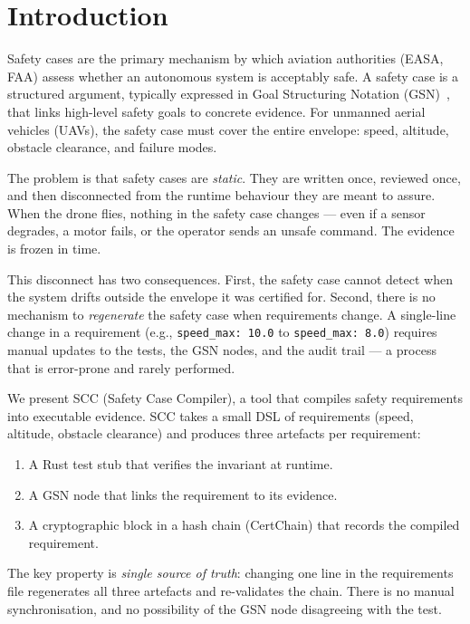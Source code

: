 ﻿\section{Introduction}

Safety cases are the primary mechanism by which aviation authorities
(EASA, FAA) assess whether an autonomous system is acceptably safe.
A safety case is a structured argument, typically expressed in Goal
Structuring Notation (GSN)~\cite{kelly1998}, that links high-level
safety goals to concrete evidence. For unmanned aerial vehicles
(UAVs), the safety case must cover the entire envelope: speed,
altitude, obstacle clearance, and failure modes.

The problem is that safety cases are \emph{static}. They are written
once, reviewed once, and then disconnected from the runtime behaviour
they are meant to assure. When the drone flies, nothing in the safety
case changes — even if a sensor degrades, a motor fails, or the
operator sends an unsafe command. The evidence is frozen in time.

This disconnect has two consequences. First, the safety case cannot
detect when the system drifts outside the envelope it was certified
for. Second, there is no mechanism to \emph{regenerate} the safety
case when requirements change. A single-line change in a requirement
(e.g., \texttt{speed\_max: 10.0} to \texttt{speed\_max: 8.0}) requires
manual updates to the tests, the GSN nodes, and the audit trail —
a process that is error-prone and rarely performed.

We present SCC (Safety Case Compiler), a tool that compiles safety
requirements into executable evidence. SCC takes a small DSL of
requirements (speed, altitude, obstacle clearance) and produces
three artefacts per requirement:

\begin{enumerate}
    \item A Rust test stub that verifies the invariant at runtime.
    \item A GSN node that links the requirement to its evidence.
    \item A cryptographic block in a hash chain (CertChain) that
          records the compiled requirement.
\end{enumerate}

The key property is \emph{single source of truth}: changing one line
in the requirements file regenerates all three artefacts and
re-validates the chain. There is no manual synchronisation, and no
possibility of the GSN node disagreeing with the test.

